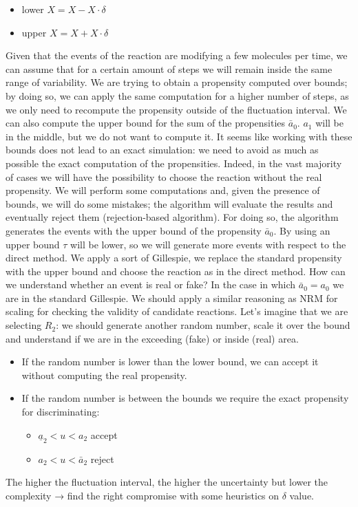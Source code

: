 \begin{itemize}
  \item lower $X = X - X \cdot \delta$ \item upper $X = X + X \cdot \delta$
\end{itemize}

Given that the events of the reaction are modifying a few molecules per time, we can assume that for a certain amount of steps we will remain inside the same range of variability.
We are trying to obtain a propensity computed over bounds; by doing so, we can apply the same computation for a higher number of steps, as we only need to recompute the propensity outside of the fluctuation interval.
We can also compute the upper bound for the sum of the propensities $\bar{a}_0$.
$a_1$ will be in the middle, but we do not want to compute it.
It seems like working with these bounds does not lead to an exact simulation: we need to avoid as much as possible the exact computation of the propensities.
Indeed, in the vast majority of cases we will have the possibility to choose the reaction without the real propensity.
We will perform some computations and, given the presence of bounds, we will do some mistakes; the algorithm will evaluate the results and eventually reject them (rejection-based algorithm).
For doing so, the algorithm generates the events with the upper bound of the propensity $\bar{a}_0$.
By using an upper bound $\tau$ will be lower, so we will generate more events with respect to the direct method.
We apply a sort of Gillespie, we replace the standard propensity with the upper bound and choose the reaction as in the direct method.
How can we understand whether an event is real or fake? In the case in which $\bar{a}_0 = a_0$ we are in the standard Gillespie.
We should apply a similar reasoning as NRM for scaling for checking the validity of candidate reactions.
Let's imagine that we are selecting $R_2$: we should generate another random number, scale it over the bound and understand if we are in the exceeding (fake) or inside (real) area.

\begin{itemize}
  \item If the random number is lower than the lower bound, we can accept it without computing the real propensity.
  \item If the random number is between the bounds we require the exact propensity for discriminating:

  \begin{itemize}
    \item $\underline{a}_2 < u < a_2$ accept \item $a_2 < u < \bar{a}_2$ reject
  \end{itemize}

\end{itemize}

The higher the fluctuation interval, the higher the uncertainty but lower the complexity → find the right compromise with some heuristics on $\delta$ value.
